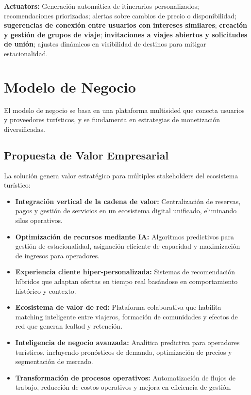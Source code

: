 \documentclass[12pt, letterpaper]{article}
\begin{document}
\textbf{Actuators:} Generación automática de itinerarios personalizados; recomendaciones priorizadas; alertas sobre cambios de precio o disponibilidad; \textbf{sugerencias de conexión entre usuarios con intereses similares}; \textbf{creación y gestión de grupos de viaje}; \textbf{invitaciones a viajes abiertos y solicitudes de unión}; ajustes dinámicos en visibilidad de destinos para mitigar estacionalidad.

\section{Modelo de Negocio}

El modelo de negocio se basa en una plataforma multisided que conecta usuarios y proveedores turísticos, y se fundamenta en estrategias de monetización diversificadas.

\subsection{Propuesta de Valor Empresarial}

La solución genera valor estratégico para múltiples stakeholders del ecosistema turístico:

\begin{itemize}
\item \textbf{Integración vertical de la cadena de valor:} Centralización de reservas, pagos y gestión de servicios en un ecosistema digital unificado, eliminando silos operativos.
\item \textbf{Optimización de recursos mediante IA:} Algoritmos predictivos para gestión de estacionalidad, asignación eficiente de capacidad y maximización de ingresos para operadores.
\item \textbf{Experiencia cliente hiper-personalizada:} Sistemas de recomendación híbridos que adaptan ofertas en tiempo real basándose en comportamiento histórico y contexto.
\item \textbf{Ecosistema de valor de red:} Plataforma colaborativa que habilita matching inteligente entre viajeros, formación de comunidades y efectos de red que generan lealtad y retención.
\item \textbf{Inteligencia de negocio avanzada:} Analítica predictiva para operadores turísticos, incluyendo pronósticos de demanda, optimización de precios y segmentación de mercado.
\item \textbf{Transformación de procesos operativos:} Automatización de flujos de trabajo, reducción de costos operativos y mejora en eficiencia de gestión.
\end{itemize}
\end{document}
